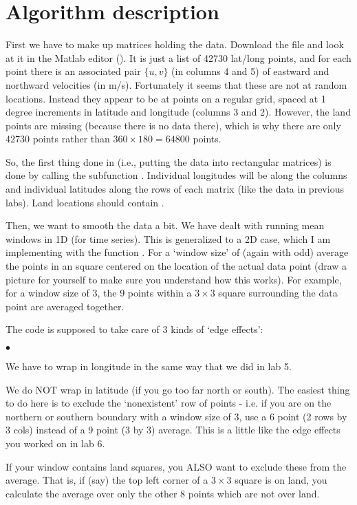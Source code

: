 \documentclass[letterpaper,12pt]{article}
\newcounter{lnum}
\newenvironment{abbrevlist}%
  {\begin{list}{$\bullet$}{\setlength{\leftmargin}{2em}%
               \setlength{\itemindent}{0em}%
               \setlength{\itemsep}{0pt}%
               \setlength{\parsep}{0pt}%
               \setlength{\topsep}{2pt}%
               \usecounter{lnum} } }{\end{list}}
\begin{document}
\vspace{-12pt}

\section*{Algorithm description}
\vspace{-12pt}

First we have to make up matrices holding the data. 
Download the  file and look at it in the Matlab editor (). It is just a list of 42730 lat/long points, and for each point there is an associated pair $\{u,v\}$ (in columns 4 and 5) of eastward and northward
velocities (in m/s). Fortunately it seems that these are not at random locations. Instead they
appear to be at points on a regular grid, spaced at 1 degree increments in
latitude and longitude (columns 3 and 2). However, the land points are missing (because there is no data there), which is why there are only 42730 points rather than $360\times180 = 64800$ points.

So, the first thing done in  (i.e., putting the data into rectangular matrices) is 
done by calling the subfunction . Individual longitudes will be along the columns and individual latitudes along the rows 
of each matrix (like
the  data in previous labs). Land locations should contain .

Then, we want to smooth the data a bit. We have dealt with running mean windows in
1D (for time series). This is generalized to a 2D case, which I am implementing with the function
. For a `window size' of  (again with  odd)  average the points in an  square centered on the location of the actual data point (draw a picture
for yourself to make sure you understand how this works). For example, for a window size of 3,  the 9 points within a $3 \times 3$ square surrounding the data point
are averaged together. 

The code is supposed to take care of 3 kinds of `edge effects': 
\begin{abbrevlist} 
\item We have to wrap in longitude  in the same way that we did in lab 5. 
\item We do NOT wrap in latitude (if you go too far north or south). 
The easiest thing to do here is to exclude the `nonexistent' row of points - i.e. if you are on the northern or southern boundary with a window size of 3, use a 6 point (2 rows by 3 cols)
instead of a 9 point (3 by 3) average. This is a little like the edge effects you worked on in lab 6.
\item If your window contains land squares, you ALSO want to exclude these from the average.
That is, if (say) the top left corner of a $3\times 3$ square is on land, you calculate the average over only the other 8 points which are not over land.
\end{abbrevlist}
\end{document}
